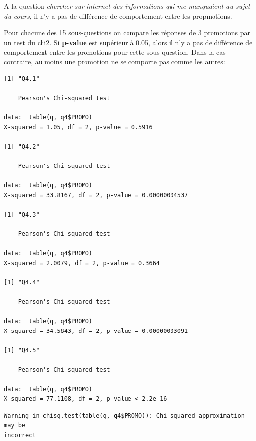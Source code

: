 \documentclass[]{article}
\begin{document}
A la question \emph{chercher sur internet des informations qui me
manquaient au sujet du cours}, il n'y a pas de différence de
comportement entre les propmotions.

Pour chacune des 15 sous-questions on compare les réponses de 3
promotions par un test du chi2. Si \textbf{p-value} est supérieur à
0.05, alors il n'y a pas de différence de comportement entre les
promotions pour cette sous-question. Dans la cas contraire, au moins une
promotion ne se comporte pas comme les autres:

\begin{verbatim}
[1] "Q4.1"

    Pearson's Chi-squared test

data:  table(q, q4$PROMO)
X-squared = 1.05, df = 2, p-value = 0.5916

[1] "Q4.2"

    Pearson's Chi-squared test

data:  table(q, q4$PROMO)
X-squared = 33.8167, df = 2, p-value = 0.00000004537

[1] "Q4.3"

    Pearson's Chi-squared test

data:  table(q, q4$PROMO)
X-squared = 2.0079, df = 2, p-value = 0.3664

[1] "Q4.4"

    Pearson's Chi-squared test

data:  table(q, q4$PROMO)
X-squared = 34.5843, df = 2, p-value = 0.00000003091

[1] "Q4.5"

    Pearson's Chi-squared test

data:  table(q, q4$PROMO)
X-squared = 77.1108, df = 2, p-value < 2.2e-16
\end{verbatim}

\begin{verbatim}
Warning in chisq.test(table(q, q4$PROMO)): Chi-squared approximation may be
incorrect
\end{verbatim}
\end{document}
